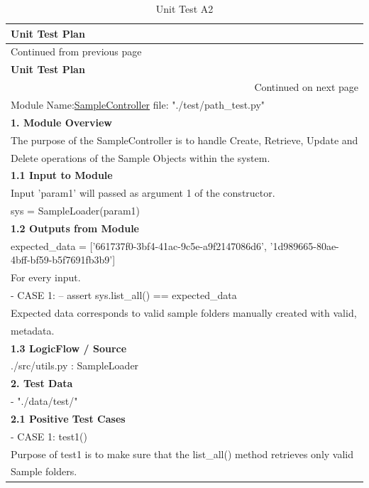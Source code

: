 \documentclass[12pt,a4paper,man]{report}
\begin{document}
\begin{longtable}{|p{7in}|}
\caption{\label{table:utest_a2}
Unit Test A2}
\\
\hline
\textbf{Unit Test Plan} \cellcolor{blue!25}\\
\hline
\endfirsthead
\multicolumn{1}{l}{Continued from previous page} \\
\hline

\textbf{Unit Test Plan} \cellcolor{blue!25} \\

\hline
\endhead
\hline\multicolumn{1}{r}{Continued on next page} \\
\endfoot
\endlastfoot
\hline
\hline
Module Name:\underline{SampleController} \hspace{2in}  file:  "./test/path\_test.py"\\
\hline
\textbf{1. Module Overview}\\
\hline
The purpose of the SampleController is to  handle Create, Retrieve, Update and\\
Delete operations of the Sample Objects within the system.\\
\hline
\textbf{1.1 Input to Module}\\
\hline
Input 'param1' will passed as argument 1 of the constructor.\\
sys = SampleLoader(param1)\\
\hline
\textbf{1.2 Outputs from Module}\\
\hline
expected\_data =  ['661737f0-3bf4-41ac-9c5e-a9f2147086d6', '1d989665-80ae-4bff-bf59-b5f7691fb3b9']\\
For every input.\\
- CASE 1:  -- assert sys.list\_all() == expected\_data\\
Expected data corresponds to valid sample folders manually created with valid,\\
metadata.\\
\hline
\textbf{1.3 LogicFlow / Source}\\
\hline
./src/utils.py : SampleLoader\\
\hline
\textbf{2. Test Data}\\
\hline
- "./data/test/"\\
\hline
\textbf{2.1 Positive Test Cases}\\
\hline
- CASE 1: test1()\\
Purpose of test1 is to make sure that the list\_all() method retrieves only valid\\
Sample folders.\\

\end{longtable}
\end{document}
